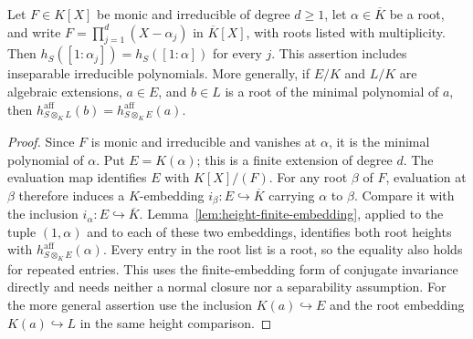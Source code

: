 \begin{lemma}
\label{lem:minimal-polynomial-root-conjugacy}
\leanok
Let $F\in K[X]$ be monic and irreducible of degree $d\geq1$, let
$\alpha\in\overline K$ be a root, and write
$F=\prod_{j=1}^d(X-\alpha_j)$ in $\overline K[X]$, with roots
listed with multiplicity. Then
$h_S([1:\alpha_j])=h_S([1:\alpha])$ for every $j$.
This assertion includes inseparable irreducible polynomials.
More generally, if $E/K$ and $L/K$ are algebraic extensions,
$a\in E$, and $b\in L$ is a root of the minimal polynomial of $a$,
then $h_{S\otimes_K L}^{\mathrm{aff}}(b)=h_{S\otimes_K E}^{\mathrm{aff}}(a)$.
\end{lemma}
\begin{proof}
Since $F$ is monic and irreducible and vanishes at $\alpha$, it is
the minimal polynomial of $\alpha$. Put $E=K(\alpha)$; this is a
finite extension of degree $d$. The evaluation map identifies $E$
with $K[X]/(F)$. For any root $\beta$ of $F$, evaluation at $\beta$
therefore induces a $K$-embedding $i_\beta:E\hookrightarrow\overline K$
carrying $\alpha$ to $\beta$. Compare it with the inclusion
$i_\alpha:E\hookrightarrow\overline K$.
Lemma~\ref{lem:height-finite-embedding}, applied to the tuple
$(1,\alpha)$ and to each of these two embeddings, identifies both
root heights with $h_{S\otimes_K E}^{\mathrm{aff}}(\alpha)$.
Every entry in the root list is a root, so the equality also holds
for repeated entries. This uses the finite-embedding form of
conjugate invariance directly and needs neither a normal closure
nor a separability assumption. For the more general assertion use
the inclusion $K(a)\hookrightarrow E$ and the root embedding
$K(a)\hookrightarrow L$ in the same height comparison.
\end{proof}

